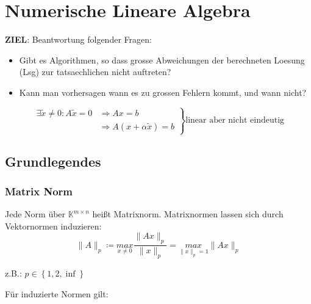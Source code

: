 \section{Numerische Lineare Algebra}
\textbf{ZIEL}: Beantwortung folgender Fragen:
\begin{itemize}
\item{Gibt es Algorithmen, so dass grosse Abweichungen der berechneten Loesung (Lsg) zur tatsaechlichen nicht auftreten?}
\item{Kann man vorhersagen wann es zu grossen Fehlern kommt, und wann nicht?}
\end{itemize}

\begin{equation*}
  \left.
    \begin{aligned}
      \exists \widetilde{x} \neq 0: A\widetilde{x} = 0 & \Rightarrow  Ax = b \\
        & \Rightarrow A(x + \alpha \widetilde{x}) = b
    \end{aligned}
  \right\}
  \text{linear aber nicht eindeutig}
\end{equation*}

\subsection{Grundlegendes}

\subsubsection{Matrix Norm}

Jede Norm über $\mathbb{K}^{m \times n}$ heißt Matrixnorm.
Matrixnormen lassen sich durch Vektornormen induzieren:
\begin{equation*}
\|A\|_p \coloneqq \underset{x \neq 0}{max} \frac{\|Ax\|_p}{\|x\|_p} = \underset{\|x\|_p = 1}{max}\|Ax\|_p
\end{equation*}

z.B.: $p \in \left\{1, 2, \inf \right\}$

Für induzierte Normen gilt:

